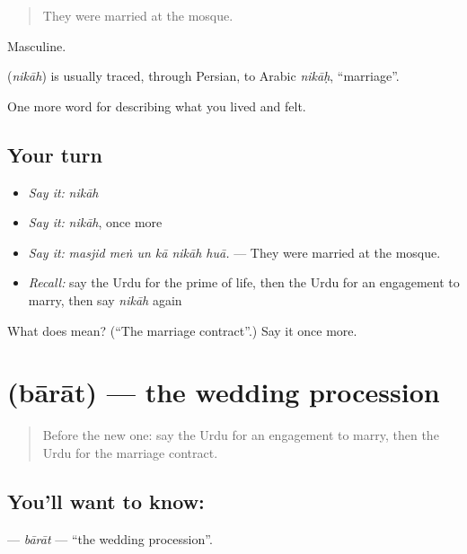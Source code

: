 \begin{quote}
They were married at the mosque.
\end{quote}

Masculine.

\begin{cousinweb}
\textbf{} (\emph{nikāh}) is usually traced, through Persian, to Arabic \emph{nikāḥ}, \textquotedblleft{}marriage\textquotedblright{}.
\end{cousinweb}

\begin{grammarlens}[title={What you've built}]
One more word for describing what you lived and felt.
\end{grammarlens}

\subsection*{Your turn}
\begin{itemize}
\raggedright
  \item \emph{Say it:} \emph{nikāh}
  \item \emph{Say it:} \emph{nikāh}, once more
  \item \emph{Say it:} \emph{masjid meṅ un kā nikāh huā.} — They were married at the mosque.
  \item \emph{Recall:} say the Urdu for the prime of life, then the Urdu for an engagement to marry, then say \emph{nikāh} again
\end{itemize}

\begin{tcolorbox}[breakable,colback=teal!4,colframe=teal!35!black,title={Before you move on}]
What does  mean? (\textquotedblleft{}The marriage contract\textquotedblright{}.) Say it once more.
\end{tcolorbox}
\section[\texorpdfstring{\ur{بارات} (bārāt)}{بارات (bārāt)}]{ (bārāt) — the wedding procession}

\label{lesson:UR-C487-barat}



\begin{quote}
Before the new one: say the Urdu for an engagement to marry, then the Urdu for the marriage contract.
\end{quote}

\subsection*{You'll want to know: }
\textbf{} — \emph{bārāt} — \textquotedblleft{}the wedding procession\textquotedblright{}.

